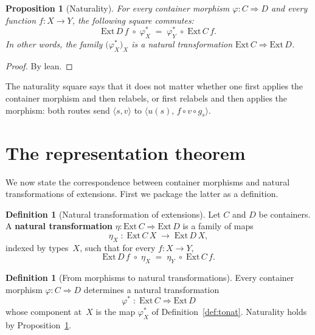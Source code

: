 \documentclass[11pt,a4paper]{article}
\theoremstyle{plain}
\newtheorem{proposition}[theorem]{Proposition}
\theoremstyle{definition}
\newtheorem{definition}[theorem]{Definition}
\newcommand{\Ext}{\mathrm{Ext}}
\begin{document}
\begin{proposition}[Naturality]\label{prop:natural}
For every container morphism $\varphi : C \Rightarrow D$ and every function
$f : X \to Y$, the following square commutes:
\begin{equation}
  \Ext\,D\,f \;\circ\; \varphi^*_X
  \;=\;
  \varphi^*_Y \;\circ\; \Ext\,C\,f.
\end{equation}
In other words, the family $\bigl(\varphi^*_X\bigr)_{X}$ is a natural
transformation $\Ext\,C \Longrightarrow \Ext\,D$.
\end{proposition}

\begin{proof}
By lean.
\end{proof}

The naturality square says that it does not matter whether one first applies
the container morphism and then relabels, or first relabels and then applies
the morphism: both routes send $\langle s, v \rangle$ to
$\langle u(s),\, f \circ v \circ g_s \rangle$.

\section{The representation theorem}

We now state the correspondence between container morphisms and natural
transformations of extensions. First we package the latter as a definition.

\begin{definition}[Natural transformation of extensions]\label{def:nattrans}
Let $C$ and $D$ be containers. A \textbf{natural transformation}
$\eta : \Ext\,C \Longrightarrow \Ext\,D$ is a family of maps
\begin{equation}
  \eta_X \;:\; \Ext\,C\,X \;\longrightarrow\; \Ext\,D\,X,
\end{equation}
indexed by types~$X$, such that for every $f : X \to Y$,
\begin{equation}
  \Ext\,D\,f \;\circ\; \eta_X
  \;=\;
  \eta_Y \;\circ\; \Ext\,C\,f.
\end{equation}
\end{definition}

\begin{definition}[From morphisms to natural transformations]\label{def:forward}
Every container morphism $\varphi : C \Rightarrow D$ determines a natural
transformation
\begin{equation}
  \varphi^* \;:\; \Ext\,C \Longrightarrow \Ext\,D
\end{equation}
whose component at~$X$ is the map $\varphi^*_X$ of Definition~\ref{def:tonat}.
Naturality holds by Proposition~\ref{prop:natural}.
\end{definition}
\end{document}
